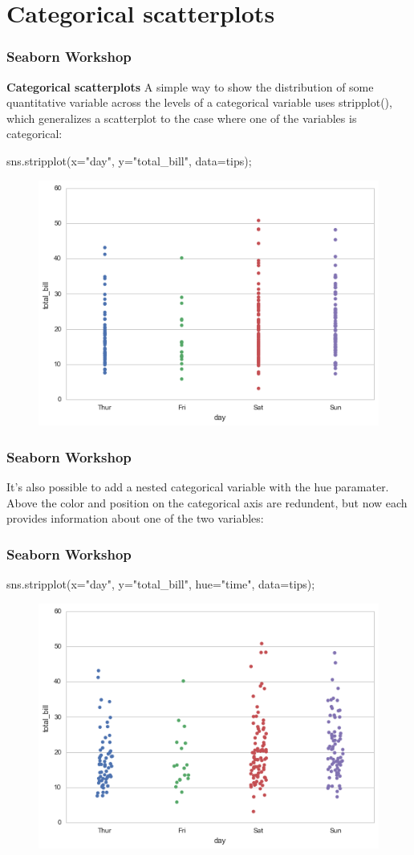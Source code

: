 \documentclass{beamer}
\begin{document}
\section{Categorical scatterplots}
\begin{frame}[fragile]
\frametitle{Seaborn Workshop}
\large
\noindent \textbf{Categorical scatterplots}
A simple way to show the distribution of some quantitative variable across the levels of a categorical variable uses stripplot(), which generalizes a scatterplot to the case where one of the variables is categorical:

sns.stripplot(x="day", y="total_bill", data=tips);
\begin{figure}
	\centering
	\includegraphics[width=0.7\linewidth]{images/categorical_9_0}
\end{figure}
\end{frame}
\begin{frame}[fragile]
\frametitle{Seaborn Workshop}
\large
It’s also possible to add a nested categorical variable with the hue paramater. Above the color and position on the categorical axis are redundent, but now each provides information about one of the two variables:
\end{frame}
\begin{frame}[fragile]
	\frametitle{Seaborn Workshop}
	\large
sns.stripplot(x="day", y="total_bill", hue="time", data=tips);
\begin{figure}
\centering
\includegraphics[width=0.7\linewidth]{images/categorical_11_0}
\end{figure}
\end{frame}
\end{document}
